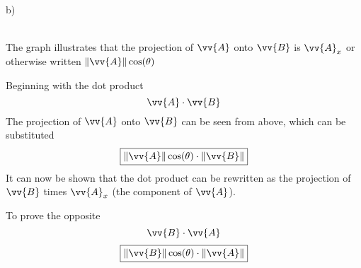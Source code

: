 \documentclass{article}
\begin{document}
b) \\
 \\
The graph illustrates that the projection of $ \vv{A} $ onto $ \vv{B} $ is $ \vv{A}_x $ or otherwise written $ \|\vv{A}\|\cos(\theta) $

Beginning with the dot product
$$ \vv{A} \cdot \vv{B} $$
The projection of $ \vv{A} $ onto $ \vv{B} $ can be seen from above, which can be substituted
\begin{equation*}
    \boxed{
        \|\vv{A}\|\cos(\theta) \cdot \|\vv{B}\|
    }
\end{equation*}
It can now be shown that the dot product can be rewritten as the projection of $ \vv{B} $ times $ \vv{A}_x $ (the component of $ \vv{A} $).

To prove the opposite
$$ \vv{B} \cdot \vv{A} $$
\begin{equation*}
    \boxed{
        \|\vv{B}\|\cos(\theta) \cdot \|\vv{A}\|
    }
\end{equation*}
\end{document}
